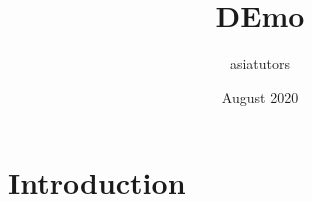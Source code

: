 \documentclass{article}
\title{DEmo}
\author{asiatutors }
\date{August 2020}
\begin{document}
\maketitle

\section{Introduction}
\end{document}
